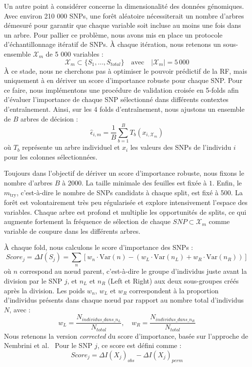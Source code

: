 \documentclass[
  11pt,
  letterpaper,
  DIV=11,
  numbers=noendperiod]{scrartcl}
\begin{document}
Un autre point à considérer concerne la dimensionalité des données
génomiques. Avec environ 210 000 SNPs, une forêt aléatoire nécessiterait
un nombre d'arbres démesuré pour garantir que chaque variable soit
incluse au moins une fois dans un arbre. Pour pallier ce problème, nous
avons mis en place un protocole d'échantillonnage itératif de SNPs. À
chaque itération, nous retenons un sous-ensemble \(\mathcal{X}_{m}\) de
5 000 variables :
\[\mathcal{X}_{m} \subset \{S_1, \dots, S_{total}\} \quad \text{avec} \quad |\mathcal{X}_{m}| = 5\,000\]
À ce stade, nous ne cherchons pas à optimiser le pouvoir prédictif de la
RF, mais uniquement à en dériver un score d'importance robuste pour
chaque SNP. Pour ce faire, nous implémentons une procédure de validation
croisée en 5-folds afin d'évaluer l'importance de chaque SNP sélectionné
dans différents contextes d'entraînement. Ainsi, sur les 4 folds
d'entraînement, nous ajustons un ensemble de \(B\) arbres de décision :
\[\hat{\epsilon}_{i,m} = \frac{1}{B} \sum_{b=1}^{B} T_b(x_{i, \mathcal{X}_m})\]
où \(T_b\) représente un arbre individuel et \(x_i\) les valeurs des
SNPs de l'individu \(i\) pour les colonnes sélectionnées.

Toujours dans l'objectif de dériver un score d'importance robuste, nous
fixons le nombre d'arbres \(B\) à 2000. La taille minimale des feuilles
est fixée à \(1\). Enfin, le \(m_{\text{try}}\), c'est-à-dire le nombre
de SNPs candidats à chaque split, est fixé à 500. La forêt est
volontairement très peu régularisée et explore intensivement l'espace
des variables. Chaque arbre est profond et multiplie les opportunités de
splits, ce qui augmente fortement la fréquence de sélection de chaque
\(SNP \subset \mathcal{X}_{m}\) comme variable de coupure dans les
différents arbres.

À chaque fold, nous calculons le score d'importance des SNPs :
\[Score_j =\Delta I(S_j) = \sum_{n} [w_n \cdot \text{Var}(n) - (w_L \cdot \text{Var}(n_L) + w_R \cdot \text{Var}(n_R))]\]
où \(n\) correspond au nœud parent, c'est-à-dire le groupe d'individus
juste avant la division par le SNP \(j\), et \(n_L\) et \(n_R\) (Left et
Right) aux deux sous-groupes créés après la division. Les poids \(w_n\),
\(w_L\) et \(w_R\) correspondent à la proportion d'individus présents
dans chaque nœud par rapport au nombre total d'individus \(N\), avec :
\[w_L = \frac{N_{individus\_dans\_n_L}}{N_{total}}, \quad w_R = \frac{N_{individus\_dans\_n_R}}{N_{total}}\]
Nous retenons la version \emph{corrected} du score d'importance, basée
sur l'approche de Nembrini et al.~ Pour le SNP \(j\), ce score est
défini comme : \[Score_j = \Delta I(X_j)_{obs} - \Delta I(X_j)_{perm}\]
\end{document}
